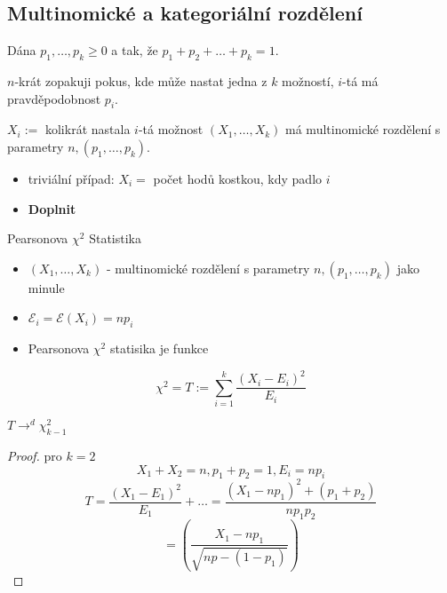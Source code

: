 \documentclass[../main.tex]{subfiles}
\begin{document}
\subsection{Multinomické a kategoriální rozdělení}
\begin{definition}
    Dána $p_1,\dots,p_k \geq 0$ a tak, že $p_1 + p_2 + \dots + p_k = 1$.
    
    $n$-krát zopakuji pokus, kde může nastat jedna z $k$ možností, $i$-tá má pravděpodobnost $p_i$.

    $X_i :=$ kolikrát nastala $i$-tá možnost $(X_1,\dots,X_k)$ má multinomické rozdělení s parametry $n,(p_1,\dots,p_k).$
    \begin{itemize}
        \item triviální případ: $X_i = $ počet hodů kostkou, kdy padlo $i$
        \item \textbf{Doplnit}
    \end{itemize}
\end{definition}
\begin{definition}
    Pearsonova $\chi^2$ Statistika\\
    \begin{itemize}
        \item $(X_1,\dots,X_k)$ - multinomické rozdělení s parametry $n, (p_1,\dots,p_k)$ jako minule
        \item $\mathcal{E}_i = \mathcal{E}(X_i) = np_i$
        \item Pearsonova $\chi^2$ statisika je funkce
    \end{itemize}
    \[\chi^2 = T:= \sum^k_{i=1} \frac{(X_i - E_i)^2}{E_i}\]
\end{definition}
\begin{theorem}
    $T \rightarrow^d \chi^2_{k-1}$
    \begin{proof}
        pro $k=2$
        \[X_1 + X_2 = n, p_1 + p_2 = 1, E_i = np_i\]
        \[T = \frac{(X_1 - E_1)^2}{E_1} + \dots = \frac{(X_1 - np_1)^2 + (p_1 + p_2)}{np_1p_2}\]
        \[ = \left(\frac{X_1 - np_1}{\sqrt{np - (1-p_1)}}\right)\]
    \end{proof}
\end{theorem}
\end{document}

